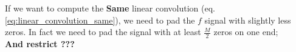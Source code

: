 \documentclass[a4paper,10pt,twoside]{article}
\begin{document}
\pagebreak

If we want to compute the \textbf{Same} linear convolution (eq. \ref{eq:linear_convolution_same}), we need to pad the $f$ signal with slightly less zeros. In fact we need to pad the signal with at least $\frac{M}{2}$ zeros on one end;\\

\textbf{And restrict ???}\\



%
%
\end{document}
